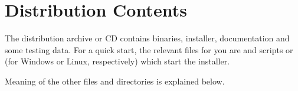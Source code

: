 


\appendix

\chapter{Distribution Contents}
The distribution archive or CD contains \odcs binaries, installer, documentation and some testing data. For a quick start, the relevant files for you are  and scripts  or  (for Windows or Linux, respectively) which start the installer.

Meaning of the other files and directories is explained below.

